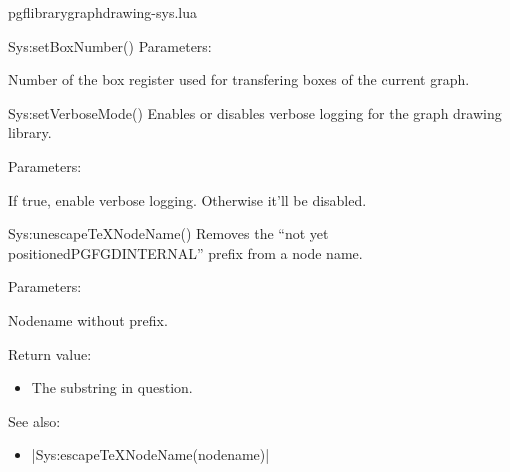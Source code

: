 \begin{filedescription}{pgflibrarygraphdrawing-sys.lua}
\begin{luacommand}{{Sys:setBoxNumber}()}
Parameters:
\begin{parameterdescription}
	\item[\meta{bn}] Number of the box register used for transfering boxes of the current graph.
\end{parameterdescription}



\end{luacommand}\begin{luacommand}{{Sys:setVerboseMode}()}
Enables or disables verbose logging for the graph drawing library.

Parameters:
\begin{parameterdescription}
	\item[\meta{mode}] If true, enable verbose logging. Otherwise it'll be disabled.
\end{parameterdescription}



\end{luacommand}\begin{luacommand}{{Sys:unescapeTeXNodeName}()}
Removes the ``not yet positionedPGFGDINTERNAL'' prefix from a node name.

Parameters:
\begin{parameterdescription}
	\item[\meta{nodename}] Nodename without prefix.
\end{parameterdescription}


Return value:
\begin{itemize} \item[] The substring in question. \end{itemize}


See also:
\begin{itemize}
	\item[] |Sys:escapeTeXNodeName(nodename)|
\end{itemize}

\end{luacommand}
\end{filedescription}